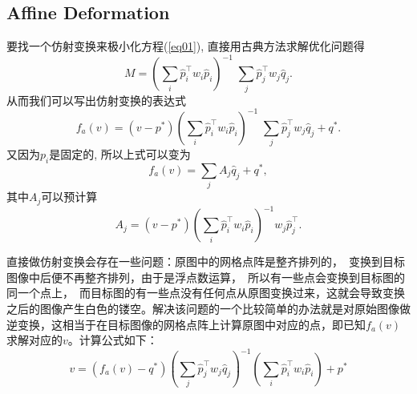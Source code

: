 \documentclass[12pt]{article}
\begin{document}
\subsection{Affine Deformation}
要找一个仿射变换来极小化方程(\ref{eq01}), 直接用古典方法求解优化问题得
\begin{equation*}
	M = \left(\sum_i\hat{p}_i^{\top}w_i\hat{p}_i\right)^{-1}\;\sum_j\hat{p}_j^{\top}w_j\hat{q}_j.
\end{equation*}
从而我们可以写出仿射变换的表达式
\begin{equation}
	f_a(v) = (v-p^*)\left(\sum_i\hat{p}_i^{\top}w_i\hat{p}_i\right)^{-1}\;\sum_j\hat{p}_j^{\top}w_j\hat{q}_j+q^*.
\end{equation}
又因为$p_i$是固定的, 所以上式可以变为
\begin{equation*}
	f_a(v) = \sum_jA_j\hat{q}_j + q^*,
\end{equation*}
其中$A_j$可以预计算
\begin{equation*}
	A_j = (v-p^*)\left(\sum_i\hat{p}_i^{\top}w_i\hat{p}_i\right)^{-1}w_j\hat{p}_j^{\top}.
\end{equation*}

直接做仿射变换会存在一些问题：原图中的网格点阵是整齐排列的，　变换到目标图像中后便不再整齐排列，由于是浮点数运算，　所以有一些点会变换到目标图的同一个点上，　而目标图的有一些点没有任何点从原图变换过来，这就会导致变换之后的图像产生白色的镂空。解决该问题的一个比较简单的办法就是对原始图像做逆变换，这相当于在目标图像的网格点阵上计算原图中对应的点，即已知$f_a(v)$求解对应的$v$。计算公式如下：
\begin{equation}
	v = (f_a(v) - q^*)\left(\sum_j\hat{p}_j^{\top}w_j\hat{q}_j\right)^{-1}\left(\sum_i\hat{p}_i^{\top}w_i\hat{p}_i\right) + p^*
\end{equation}
\end{document}
